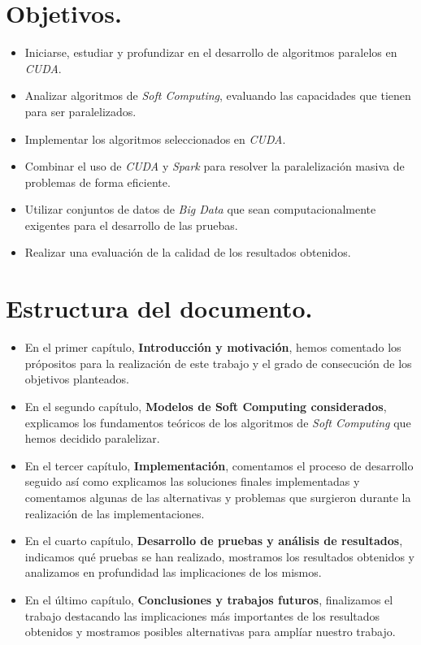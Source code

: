 \documentclass[a4paper,oneside,11pt,titlepage]{book}
\begin{document}
\section{Objetivos.}
\begin{itemize}
    \item Iniciarse, estudiar y profundizar en el desarrollo de algoritmos paralelos en \textit{CUDA}.
    \item Analizar algoritmos de \textit{Soft Computing}, evaluando las capacidades que tienen para ser paralelizados.
    \item Implementar los algoritmos seleccionados en \textit{CUDA}.
    \item Combinar el uso de \textit{CUDA} y \textit{Spark} para resolver la paralelización masiva de problemas de forma eficiente.
    \item Utilizar conjuntos de datos de \textit{Big Data} que sean computacionalmente exigentes para el desarrollo de las pruebas.
    \item Realizar una evaluación de la calidad de los resultados obtenidos.
\end{itemize}

\section{Estructura del documento.}

\begin{itemize}
    \item En el primer capítulo, \textbf{Introducción y motivación}, hemos comentado los própositos para la realización de este trabajo y el grado de consecución de los objetivos planteados.
    \item En el segundo capítulo, \textbf{Modelos de Soft Computing considerados}, explicamos los fundamentos teóricos de los algoritmos de \textit{Soft Computing} que hemos decidido paralelizar.
    \item En el tercer capítulo, \textbf{Implementación}, comentamos el proceso de desarrollo seguido así como explicamos las soluciones finales implementadas y comentamos algunas de las alternativas y problemas que surgieron durante la realización de las implementaciones.
    \item En el cuarto capítulo, \textbf{Desarrollo de pruebas y análisis de resultados}, indicamos qué pruebas se han realizado, mostramos los resultados obtenidos y analizamos en profundidad las implicaciones de los mismos.
    \item En el último capítulo, \textbf{Conclusiones y trabajos futuros}, finalizamos el trabajo destacando las implicaciones más importantes de los resultados obtenidos y mostramos posibles alternativas para amplíar nuestro trabajo.
\end{itemize}
\end{document}
